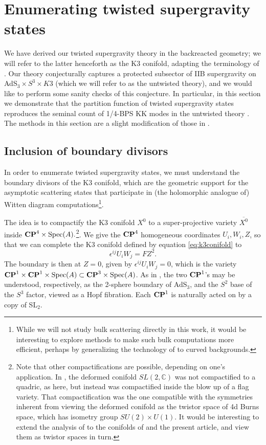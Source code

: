 \documentclass[../main.tex]{subfiles}
\begin{document}
\section{Enumerating twisted supergravity states}

We have derived our twisted supergravity theory in the backreacted geometry; we will refer to the latter henceforth as the K3 conifold, adapting the terminology of \cite{CP}. Our theory conjecturally captures a protected subsector of IIB supergravity on AdS$_3 \times S^3 \times K3$ (which we will refer to as the untwisted theory), and we would like to perform some sanity checks of this conjecture. In particular, in this section we demonstrate that the partition function of twisted supergravity states reproduces the seminal count of 1/4-BPS KK modes in the untwisted theory \cite{deBoerSUGRA}. The methods in this section are a slight modification of those in \cite{CostelloGaiotto, CP}. 

\subsection{Inclusion of boundary divisors}\label{sec:compact}

In order to enumerate twisted supergravity states, we must understand the boundary divisors of the K3 conifold, which are the geometric support for the asymptotic scattering states that participate in (the holomorphic analogue of) Witten diagram computations\footnote{While we will not study bulk scattering directly in this work, it would be interesting to explore methods to make such bulk computations more efficient, perhaps by generalizing the technology of \cite{Budzik:2022mpd, Budzik:2023xbr} to curved backgrounds.}. 

The idea is to compactify the K3 conifold $X^0$ to a super-projective variety $\overline{X^0}$ inside $\mathbf{CP}^4 \times \textrm{Spec}(A).$\footnote{Note that other compactifications are possible, depending on one's application. In \cite{Burns}, the deformed conifold $SL(2, \mathbb{C})$ was not compactified to a quadric, as here, but instead was compactified inside the blow up of a flag variety. That compactification was the one compatible with the symmetries inherent from viewing the deformed conifold as the twistor space of 4d Burns space, which has isometry group $SU(2) \times U(1)$. It would be interesting to extend the analysis of \cite{Burns} to the conifolds of \cite{CP} and the present article, and view them as twistor spaces in turn.}. We give the $\mathbf{CP}^4$ homogeneous coordinates $U_i, W_i, Z$, so that we can complete the K3 conifold defined by equation \ref{eq:k3conifold} to 
\begin{equation}
\epsilon^{ij}U_i W_j = F Z^2.
\end{equation}
The boundary is then at $Z=0$, given by $\epsilon^{ij}U_i W_j = 0$, which is the variety $\mathbf{CP}^1 \times \mathbf{CP}^1 \times \textrm{Spec}(A) \subset \mathbf{CP}^3 \times \textrm{Spec}(A)$. As in \cite{CostelloGaiotto}, the two $\mathbf{CP}^1$'s may be understood, respectively, as the 2-sphere boundary of AdS$_3$, and the $S^2$ base of the $S^3$ factor, viewed as a Hopf fibration. Each $\mathbf{CP}^1$ is naturally acted on by a copy of SL$_2$.
\end{document}
